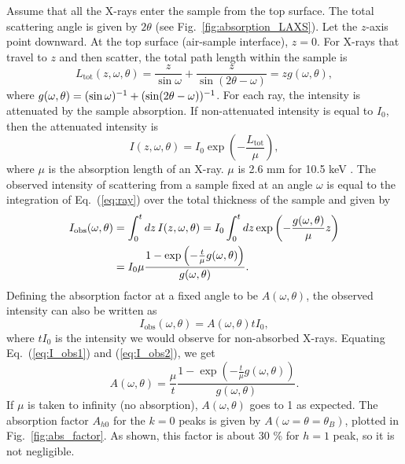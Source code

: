 Assume that all the X-rays enter the sample from the top surface. The total scattering
angle is given by $2\theta$ (see Fig.~\ref{fig:absorption_LAXS}).
Let the $z$-axis point downward. At the top surface
(air-sample interface), $z=0$. For X-rays that travel to $z$ and then scatter, the
total path length within the sample is 
\begin{equation}
  L_\textrm{tot}(z,\omega,\theta) 
  = \frac{z}{\sin\omega}+\frac{z}{\sin(2\theta-\omega)} 
  = zg(\omega,\theta),
\end{equation}
where $g(\omega,\theta)=(\sin\omega)^{-1}+\mathopen{}\left( \sin\mathopen{}\left( 2\theta-\omega \right)\mathclose{} \right)\mathclose{}^{-1}$.
For each ray, the intensity is attenuated by the sample absorption. 
If non-attenuated 
intensity is equal to $I_0$, then the attenuated intensity is
\begin{equation}
  I(z,\omega,\theta) = I_0\exp\left(-\frac{L_\textrm{tot}}{\mu}\right),
  \label{eq:ray}
\end{equation}
where $\mu$ is the absorption length of an X-ray. $\mu$ is 2.6 mm for 10.5 keV
\cite{ref:cxro}.
The observed intensity of scattering from a sample fixed at an angle $\omega$ 
is equal to the integration
of Eq.~(\ref{eq:ray}) over the total thickness of the sample and given by
\begin{align}
  I_{\textrm{obs}}(\omega,\theta) 
    &= \int_0^t \mathop{dz} I(z,\omega,\theta)
     = I_0\int_0^t\mathop{dz} \exp\left(-\frac{g(\omega,\theta)}{\mu}z\right) \nonumber \\
    &= I_0\mu \frac{1-\exp\left(-\frac{t}{\mu}g(\omega,\theta)\right)}{g(\omega,\theta)}.
    \label{eq:I_obs1}
\end{align}
Defining the absorption factor at a fixed angle to be $A(\omega,\theta)$, 
the observed intensity can also be written as
\begin{equation}
I_{\textrm{obs}}(\omega,\theta)=A(\omega,\theta)tI_0,
\label{eq:I_obs2}
\end{equation}
where $tI_0$ is the intensity we would observe for non-absorbed X-rays.
Equating Eq.~(\ref{eq:I_obs1}) and (\ref{eq:I_obs2}), we get
\begin{equation}
  A(\omega,\theta) = \frac{\mu}{t} 
                     \frac{1-\exp\left(-\frac{t}{\mu}g(\omega,\theta)\right)}{g(\omega,\theta)}.
  \label{eq:ang_abs_factor}
\end{equation}
If $\mu$ is taken to infinity (no absorption), $A(\omega,\theta)$ 
goes to 1 as expected.
The absorption factor $A_{h0}$ for the $k=0$ peaks is given by
$A(\omega=\theta=\theta_B)$, plotted in Fig.~\ref{fig:abs_factor}.
As shown, this factor is about 30 \% for $h=1$ peak, so it is not negligible.

